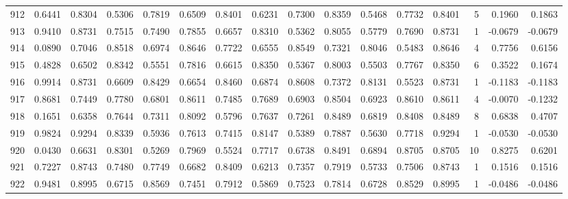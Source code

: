 \begin{tabular}{lrrrrrrrrrrrrrrr}
912 &      0.6441 &  0.8304 &  0.5306 &  0.7819 &  0.6509 &  0.8401 &  0.6231 &  0.7300 &  0.8359 &  0.5468 &   0.7732 &     0.8401 &      5 &                    0.1960 &                     0.1863 \\
913 &      0.9410 &  0.8731 &  0.7515 &  0.7490 &  0.7855 &  0.6657 &  0.8310 &  0.5362 &  0.8055 &  0.5779 &   0.7690 &     0.8731 &      1 &                   -0.0679 &                    -0.0679 \\
914 &      0.0890 &  0.7046 &  0.8518 &  0.6974 &  0.8646 &  0.7722 &  0.6555 &  0.8549 &  0.7321 &  0.8046 &   0.5483 &     0.8646 &      4 &                    0.7756 &                     0.6156 \\
915 &      0.4828 &  0.6502 &  0.8342 &  0.5551 &  0.7816 &  0.6615 &  0.8350 &  0.5367 &  0.8003 &  0.5503 &   0.7767 &     0.8350 &      6 &                    0.3522 &                     0.1674 \\
916 &      0.9914 &  0.8731 &  0.6609 &  0.8429 &  0.6654 &  0.8460 &  0.6874 &  0.8608 &  0.7372 &  0.8131 &   0.5523 &     0.8731 &      1 &                   -0.1183 &                    -0.1183 \\
917 &      0.8681 &  0.7449 &  0.7780 &  0.6801 &  0.8611 &  0.7485 &  0.7689 &  0.6903 &  0.8504 &  0.6923 &   0.8610 &     0.8611 &      4 &                   -0.0070 &                    -0.1232 \\
918 &      0.1651 &  0.6358 &  0.7644 &  0.7311 &  0.8092 &  0.5796 &  0.7637 &  0.7261 &  0.8489 &  0.6819 &   0.8408 &     0.8489 &      8 &                    0.6838 &                     0.4707 \\
919 &      0.9824 &  0.9294 &  0.8339 &  0.5936 &  0.7613 &  0.7415 &  0.8147 &  0.5389 &  0.7887 &  0.5630 &   0.7718 &     0.9294 &      1 &                   -0.0530 &                    -0.0530 \\
920 &      0.0430 &  0.6631 &  0.8301 &  0.5269 &  0.7969 &  0.5524 &  0.7717 &  0.6738 &  0.8491 &  0.6894 &   0.8705 &     0.8705 &     10 &                    0.8275 &                     0.6201 \\
921 &      0.7227 &  0.8743 &  0.7480 &  0.7749 &  0.6682 &  0.8409 &  0.6213 &  0.7357 &  0.7919 &  0.5733 &   0.7506 &     0.8743 &      1 &                    0.1516 &                     0.1516 \\
922 &      0.9481 &  0.8995 &  0.6715 &  0.8569 &  0.7451 &  0.7912 &  0.5869 &  0.7523 &  0.7814 &  0.6728 &   0.8529 &     0.8995 &      1 &                   -0.0486 &                    -0.0486 \\

\end{tabular}
